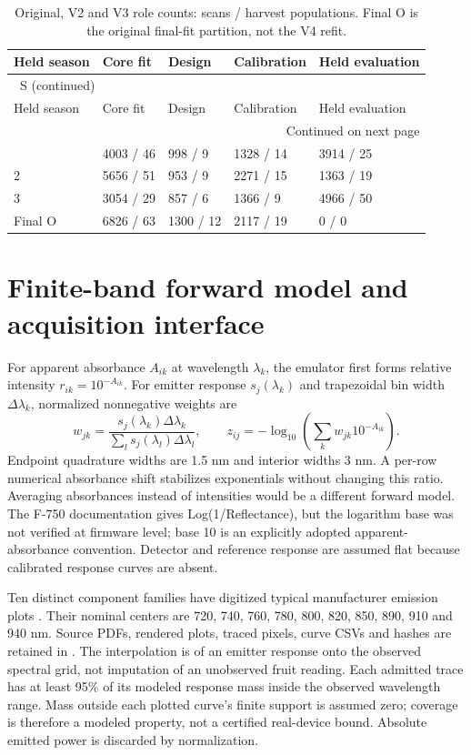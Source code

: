 \documentclass[10pt,a4paper]{article}
\renewcommand{\thetable}{S\arabic{table}}
\begin{document}
\clearpage
\begingroup\small
\setlength{\tabcolsep}{3.5pt}
\renewcommand{\arraystretch}{1.10}
\begin{longtable}{lllll}
\caption{Original, V2 and V3 role counts: scans / harvest populations. Final O is the original final-fit partition, not the V4 refit.}\label{tab:roles}\\
\toprule
Held season & Core fit & Design & Calibration & Held evaluation \\
\midrule
\endfirsthead
\multicolumn{5}{l}{\tablename~\thetable{} (continued)}\\
\toprule
Held season & Core fit & Design & Calibration & Held evaluation \\
\midrule
\endhead
\midrule
\multicolumn{5}{r}{Continued on next page}\\
\endfoot
\bottomrule
\endlastfoot
1 & 4003 / 46 & 998 / 9 & 1328 / 14 & 3914 / 25 \\
2 & 5656 / 51 & 953 / 9 & 2271 / 15 & 1363 / 19 \\
3 & 3054 / 29 & 857 / 6 & 1366 / 9 & 4966 / 50 \\
Final O & 6826 / 63 & 1300 / 12 & 2117 / 19 & 0 / 0 \\
\end{longtable}
\endgroup

\section{Finite-band forward model and acquisition interface}
For apparent absorbance $A_{ik}$ at wavelength $\lambda_k$, the emulator first forms relative intensity $r_{ik}=10^{-A_{ik}}$. For emitter response $s_j(\lambda_k)$ and trapezoidal bin width $\Delta\lambda_k$, normalized nonnegative weights are
\[
 w_{jk}=\frac{s_j(\lambda_k)\Delta\lambda_k}{\sum_l s_j(\lambda_l)\Delta\lambda_l},\qquad
 z_{ij}=-\log_{10}\!\left(\sum_k w_{jk}10^{-A_{ik}}\right).
\]
Endpoint quadrature widths are 1.5 nm and interior widths 3 nm. A per-row numerical absorbance shift stabilizes exponentials without changing this ratio. Averaging absorbances instead of intensities would be a different forward model. The F-750 documentation gives Log(1/Reflectance), but the logarithm base was not verified at firmware level; base 10 is an explicitly adopted apparent-absorbance convention. Detector and reference response are assumed flat because calibrated response curves are absent.

Ten distinct component families have digitized typical manufacturer emission plots \citep{roithnercatalog}. Their nominal centers are 720, 740, 760, 780, 800, 820, 850, 890, 910 and 940 nm. Source PDFs, rendered plots, traced pixels, curve CSVs and hashes are retained in . The interpolation is of an emitter response onto the observed spectral grid, not imputation of an unobserved fruit reading. Each admitted trace has at least 95\% of its modeled response mass inside the observed wavelength range. Mass outside each plotted curve's finite support is assumed zero; coverage is therefore a modeled property, not a certified real-device bound. Absolute emitted power is discarded by normalization.
\end{document}
